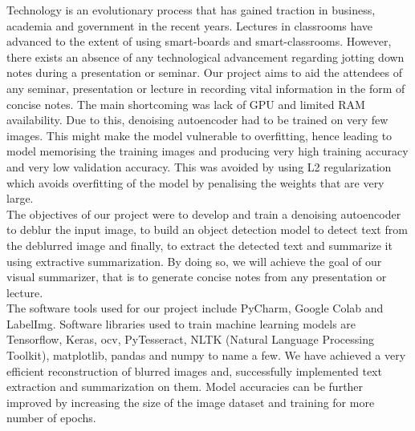 \vspace{-1cm}




Technology is an evolutionary process that has gained traction in business, academia and government in the recent years. Lectures in classrooms have advanced to the extent of using smart-boards and smart-classrooms. However, there exists an absence of any technological advancement regarding jotting down notes during a presentation or seminar. Our project aims to aid the attendees of any seminar, presentation or lecture in recording vital information in the form of concise notes. The main shortcoming was lack of GPU and limited RAM availability. Due to this, denoising autoencoder had to be trained on very few images. This might make the model vulnerable to overfitting, hence leading to model memorising the training images and producing very high training accuracy and very low validation accuracy. This was avoided by using L2 regularization which avoids overfitting of the model by penalising the weights that are very large.\\


The objectives of our project were to develop and train a denoising autoencoder to deblur the input image, to build an object detection model to detect text from the deblurred image and finally, to extract the detected text and summarize it using extractive summarization. By doing so, we will achieve the goal of our visual summarizer, that is to generate concise notes from any presentation or lecture.\\



The software tools used for our project include PyCharm, Google Colab and LabelImg. Software libraries used to train machine learning models are Tensorflow, Keras, \acrshort{ocv}, PyTesseract, NLTK (Natural Language Processing Toolkit), matplotlib, pandas and numpy to name a few. We have achieved a very efficient reconstruction of blurred images and, successfully implemented text extraction and summarization on them. Model accuracies can be further improved by increasing the size of the image dataset and training for more number of epochs.

\pagebreak